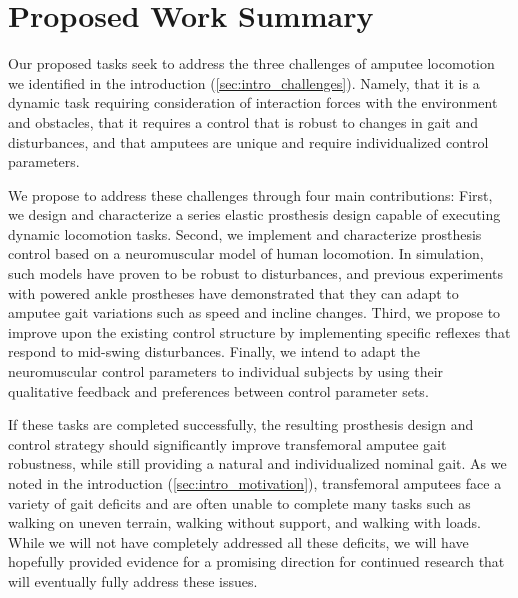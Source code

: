 \section{Proposed Work Summary}\label{sec:proposed_summary}

Our proposed tasks seek to address the three challenges of amputee locomotion we
identified in the introduction (\cref{sec:intro_challenges}). Namely, that it is
a dynamic task requiring consideration of interaction forces with the
environment and obstacles, that it requires a control that is robust to changes
in gait and disturbances, and that amputees are unique and require
individualized control parameters. 

We propose to address these challenges through four main contributions: First,
we design and characterize a series elastic prosthesis design capable of
executing dynamic locomotion tasks. Second, we implement and characterize
prosthesis control based on a neuromuscular model of human locomotion. In
simulation, such models have proven to be robust to disturbances, and previous
experiments with powered ankle prostheses have demonstrated that they can adapt
to amputee gait variations such as speed and incline changes. Third, we propose
to improve upon the existing control structure by implementing specific reflexes
that respond to mid-swing disturbances. Finally, we intend to adapt the
neuromuscular control parameters to individual subjects by using their
qualitative feedback and preferences between control parameter sets.

If these tasks are completed successfully, the resulting prosthesis design and
control strategy should significantly improve transfemoral amputee gait
robustness, while still providing a natural and individualized nominal gait. As
we noted in the introduction (\cref{sec:intro_motivation}), transfemoral
amputees face a variety of gait deficits and are often unable to complete many
tasks such as walking on uneven terrain, walking without support, and walking
with loads. While we will not have completely addressed all these deficits, we
will have hopefully provided evidence for a promising direction for continued
research that will eventually fully address these issues. 
